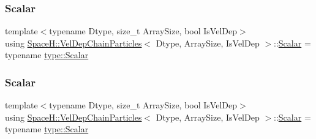 \mbox{\label{class_space_h_1_1_vel_dep_chain_particles_a1f624cc5755ed9e9c7f3a519730fc232}} 
\subsubsection{\texorpdfstring{Scalar}{Scalar}\hspace{0.1cm}{\footnotesize\ttfamily [1/2]}}
{\footnotesize\ttfamily template$<$typename Dtype, size\+\_\+t Array\+Size, bool Is\+Vel\+Dep$>$ \\
using \mbox{\hyperlink{class_space_h_1_1_vel_dep_chain_particles}{Space\+H\+::\+Vel\+Dep\+Chain\+Particles}}$<$ Dtype, Array\+Size, Is\+Vel\+Dep $>$\+::\mbox{\hyperlink{class_space_h_1_1_vel_indep_particles_aeb47d8131b30ed790320ff634f0d6af1}{Scalar}} =  typename \mbox{\hyperlink{struct_space_h_1_1_proto_type_af3c8245d83d9db64749882920de5c274}{type\+::\+Scalar}}}

\mbox{\label{class_space_h_1_1_vel_dep_chain_particles_a1f624cc5755ed9e9c7f3a519730fc232}} 
\subsubsection{\texorpdfstring{Scalar}{Scalar}\hspace{0.1cm}{\footnotesize\ttfamily [2/2]}}
{\footnotesize\ttfamily template$<$typename Dtype, size\+\_\+t Array\+Size, bool Is\+Vel\+Dep$>$ \\
using \mbox{\hyperlink{class_space_h_1_1_vel_dep_chain_particles}{Space\+H\+::\+Vel\+Dep\+Chain\+Particles}}$<$ Dtype, Array\+Size, Is\+Vel\+Dep $>$\+::\mbox{\hyperlink{class_space_h_1_1_vel_indep_particles_aeb47d8131b30ed790320ff634f0d6af1}{Scalar}} =  typename \mbox{\hyperlink{struct_space_h_1_1_proto_type_af3c8245d83d9db64749882920de5c274}{type\+::\+Scalar}}}

\mbox{\label{class_space_h_1_1_vel_dep_chain_particles_a1b6480883ff99b7648c1a68a714af20f}} 
